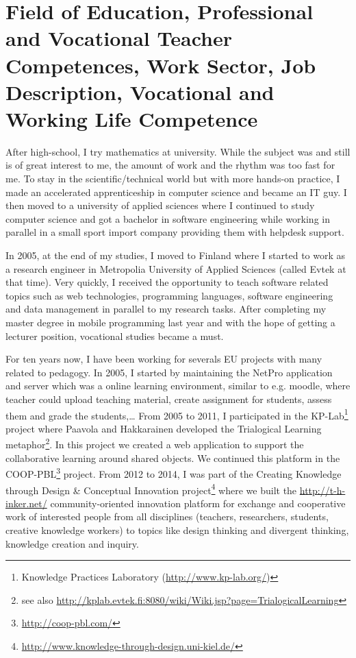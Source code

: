 \section{Field of Education, Professional and Vocational Teacher Competences, Work Sector, Job Description, Vocational and Working Life Competence}

After high-school, I try mathematics at university. While the subject was and still is of great interest to me, the amount of work and the rhythm was too fast for me. 
To stay in the scientific/technical world but with more hands-on practice, I made an accelerated apprenticeship in computer science and became an IT guy. 
I then moved to a university of applied sciences where I continued to study computer science and got a bachelor in software engineering while working in parallel in a small sport import company providing them with helpdesk support.

In 2005, at the end of my studies, I moved to Finland where I started to work as a research engineer in Metropolia University of Applied Sciences (called Evtek at that time). 
Very quickly, I received the opportunity to teach software related topics such as web technologies, programming languages, software engineering and data management in parallel to my research tasks. 
After completing my master degree in mobile programming last year and with the hope of getting a lecturer position, vocational studies became a must.

For ten years now, I have been working for severals EU projects with many related to pedagogy. 
In 2005, I started by maintaining the NetPro application and server which was a online learning environment, similar to e.g. moodle, where teacher could upload teaching material, create assignment for students, assess them and grade the students,\ldots
From 2005 to 2011, I participated in the KP-Lab\footnote{Knowledge Practices Laboratory (\url{http://www.kp-lab.org/})} project where Paavola and Hakkarainen \cite{Paavola_2005} developed the Trialogical Learning metaphor\footnote{see also \url{http://kplab.evtek.fi:8080/wiki/Wiki.jsp?page=TrialogicalLearning}}. In this project we created a web application to support the collaborative learning around shared objects.
We continued this platform in the COOP-PBL\footnote{\url{http://coop-pbl.com/}} project.
From 2012 to 2014, I was part of the Creating Knowledge through Design & Conceptual Innovation project\footnote{\url{http://www.knowledge-through-design.uni-kiel.de/}} where we built the \url{http://t-h-inker.net/} community-oriented innovation platform for exchange and cooperative work of interested people from all disciplines (teachers, researchers, students, creative knowledge workers) to topics like design thinking and divergent thinking, knowledge creation and inquiry. 

